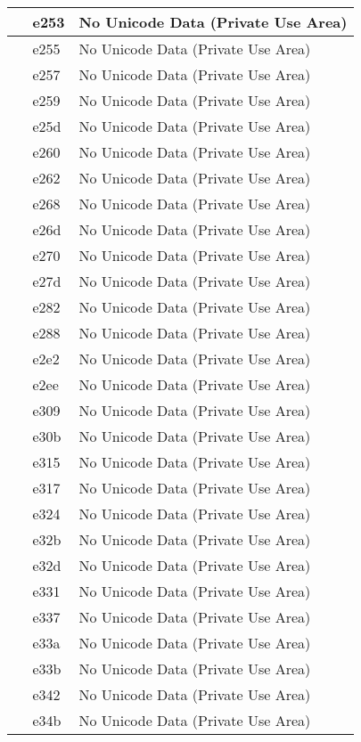 \documentclass[12pt,letterpaper,openany]{book}
\begin{document}
\begin{center}
\begin{supertabular}{|m{0.25in}|m{0.5in}|m{4in}|}
 & e253 & No Unicode Data (Private Use Area)\\\hline
 & e255 & No Unicode Data (Private Use Area)\\\hline
 & e257 & No Unicode Data (Private Use Area)\\\hline
 & e259 & No Unicode Data (Private Use Area)\\\hline
 & e25d & No Unicode Data (Private Use Area)\\\hline
 & e260 & No Unicode Data (Private Use Area)\\\hline
 & e262 & No Unicode Data (Private Use Area)\\\hline
 & e268 & No Unicode Data (Private Use Area)\\\hline
 & e26d & No Unicode Data (Private Use Area)\\\hline
 & e270 & No Unicode Data (Private Use Area)\\\hline
 & e27d & No Unicode Data (Private Use Area)\\\hline
 & e282 & No Unicode Data (Private Use Area)\\\hline
 & e288 & No Unicode Data (Private Use Area)\\\hline
 & e2e2 & No Unicode Data (Private Use Area)\\\hline
 & e2ee & No Unicode Data (Private Use Area)\\\hline
 & e309 & No Unicode Data (Private Use Area)\\\hline
 & e30b & No Unicode Data (Private Use Area)\\\hline
 & e315 & No Unicode Data (Private Use Area)\\\hline
 & e317 & No Unicode Data (Private Use Area)\\\hline
 & e324 & No Unicode Data (Private Use Area)\\\hline
 & e32b & No Unicode Data (Private Use Area)\\\hline
 & e32d & No Unicode Data (Private Use Area)\\\hline
 & e331 & No Unicode Data (Private Use Area)\\\hline
 & e337 & No Unicode Data (Private Use Area)\\\hline
 & e33a & No Unicode Data (Private Use Area)\\\hline
 & e33b & No Unicode Data (Private Use Area)\\\hline
 & e342 & No Unicode Data (Private Use Area)\\\hline
 & e34b & No Unicode Data (Private Use Area)\\\hline

\end{supertabular}
\end{center}
\end{document}
